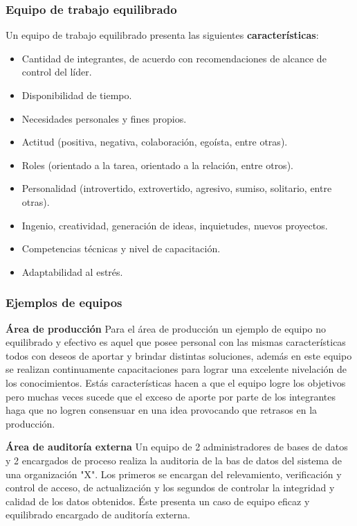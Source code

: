 \subsubsection{Equipo de trabajo equilibrado}

Un equipo de trabajo equilibrado presenta las siguientes \textbf{características}:

\begin{itemize}
    \item Cantidad de integrantes, de acuerdo con recomendaciones de alcance de control del líder.
    \item Disponibilidad de tiempo.
    \item Necesidades personales y fines propios.
    \item Actitud (positiva, negativa, colaboración, egoísta, entre otras).
    \item Roles (orientado a la tarea, orientado a la relación, entre otros).
    \item Personalidad (introvertido, extrovertido, agresivo, sumiso, solitario, entre otras).
    \item Ingenio, creatividad, generación de ideas, inquietudes, nuevos proyectos.
    \item Competencias técnicas y nivel de capacitación.
    \item Adaptabilidad al estrés.
\end{itemize}

\subsubsection{Ejemplos de equipos}

\textbf{Área de producción}
Para el área de producción un ejemplo de equipo no equilibrado y efectivo es aquel que posee  personal con las mismas características todos con deseos de aportar y brindar distintas soluciones, además en este equipo se realizan continuamente capacitaciones para lograr una excelente nivelación de los conocimientos.
Estás características hacen a que el equipo logre los objetivos pero muchas veces sucede que el exceso de aporte por parte de los integrantes haga que no logren consensuar en una idea provocando que retrasos en la producción.


\textbf{Área de auditoría externa}
Un equipo de 2 administradores de bases de datos y 2 encargados de proceso realiza la auditoria de la bas de datos del sistema de una organización "X". Los primeros se encargan del relevamiento, verificación y control de acceso, de actualización y los segundos de controlar la integridad y calidad de los datos obtenidos. Éste presenta un caso de equipo eficaz y equilibrado encargado de auditoría externa.


